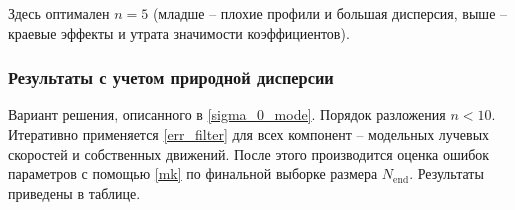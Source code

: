 \documentclass{matmex-diploma-custom}
\begin{document}
Здесь оптимален $n = 5$ (младше -- плохие профили и большая дисперсия, выше -- краевые эффекты и утрата значимости коэффициентов).

\pagebreak

\subsubsection{Результаты с учетом природной дисперсии} \label{sigma_0_mode_section}
Вариант решения, описанного в \ref{sigma_0_mode}. Порядок разложения $n < 10$. Итеративно применяется \ref{err_filter} для всех компонент -- модельных лучевых скоростей и собственных движений. После этого производится оценка ошибок параметров с помощью \ref{mk} по финальной выборке размера $N_{\mathrm{end}}$. Результаты приведены в таблице. 
\end{document}
